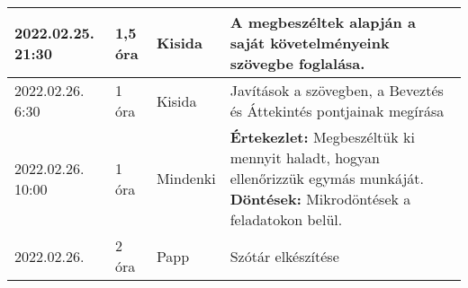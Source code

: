 \begin{tabularx}{\textwidth}{|p{2cm}|l|l|X|}
	\hline
	2022.02.25. 21:30 & 1,5 óra   & Kisida     & A megbeszéltek alapján a saját követelményeink szövegbe foglalása.                                                                                                                                                                                                                                                                                                                                                                                                                                                                                                                                                                             \\
	\hline
	2022.02.26. 6:30  & 1 óra     & Kisida     & Javítások a szövegben, a Beveztés és Áttekintés pontjainak megírása                                                                                                                                                                                                                                                                                                                                                                                                                                                                                                                                                                            \\
	\hline
	2022.02.26. 10:00 & 1 óra     & Mindenki   & \textbf{Értekezlet:} Megbeszéltük ki mennyit haladt, hogyan ellenőrizzük egymás munkáját. \textbf{Döntések:} Mikrodöntések a feladatokon belül.                                                                                                                                                                                                                                                                                                                                                                                                                                                                                                \\
	\hline
	2022.02.26.       & 2 óra     & Papp       & Szótár elkészítése                                                                                                                                                                                                                                                                                                                                                                                                                                                                                                                                                                                                                             \\

\end{tabularx}

